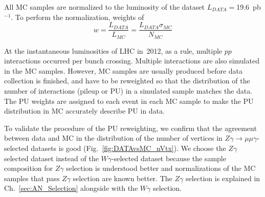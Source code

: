 All MC samples are normalized to the luminosity of the dataset $L_{DATA}=$19.6~pb$^{-1}$. To perform the normalization, weights of
\begin{equation}
  w = \frac{L_{DATA}}{L_{MC}} = \frac{L_{DATA} \sigma_{MC}}{N_{MC}}
\end{equation}

At the instantaneous luminosities of LHC in~2012, as a rule, multiple $pp$ interactions occurred per bunch crossing. Multiple interactions are also simulated in the MC samples. However, MC samples are usually produced before data collection is finished, and have to be reweighted so that the distribution of the number of interactions (pileup or PU) in a simulated sample matches the data. The PU weights are assigned to each event in each MC sample to make the PU distribution in MC accurately describe PU in data.

To validate the procedure of the PU reweighting, we confirm that the agreement between data and MC in the distribution of the number of vertices in $Z\gamma\rightarrow\mu\mu\gamma$-selected datasets is good (Fig.~\ref{fig:DATAvsMC_nVtx}). We choose the $Z\gamma$ selected dataset instead of the $W\gamma$-selected dataset because the sample composition for $Z\gamma$ selection is understood better and normalizations of the MC samples that pass $Z\gamma$ selection are known better. The $Z\gamma$ selection is explained in Ch.~\ref{sec:AN_Selection} alongside with the $W\gamma$ selection.

